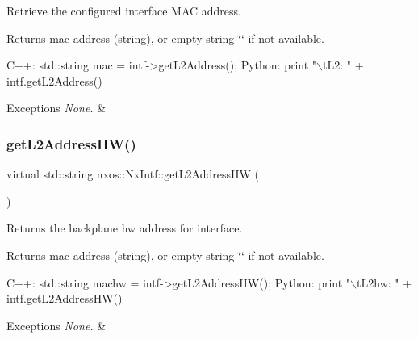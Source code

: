 Retrieve the configured interface M\+AC address.

\begin{DoxyReturn}{Returns}
mac address (string), or empty string \char`\"{}\char`\"{} if not available.
\end{DoxyReturn}

\begin{DoxyCode}
C++:
     std::string  mac = intf->getL2Address();
Python:
      print \textcolor{stringliteral}{"\(\backslash\)tL2: "} + intf.getL2Address()
\end{DoxyCode}



\begin{DoxyExceptions}{Exceptions}
{\em None.} & \\
\hline
\end{DoxyExceptions}
\mbox{\label{classnxos_1_1_nx_intf_a2c057f3f9691205712f70aea8c46f639}} 
\subsubsection{\texorpdfstring{get\+L2\+Address\+H\+W()}{getL2AddressHW()}}
{\footnotesize\ttfamily virtual std\+::string nxos\+::\+Nx\+Intf\+::get\+L2\+Address\+HW (\begin{DoxyParamCaption}{ }\end{DoxyParamCaption})\hspace{0.3cm}{\ttfamily [pure virtual]}}

Returns the backplane hw address for interface. ~\newline
 \begin{DoxyReturn}{Returns}
mac address (string), or empty string \char`\"{}\char`\"{} if not available.
\end{DoxyReturn}

\begin{DoxyCode}
C++:
      std::string  machw = intf->getL2AddressHW();
Python:
       print \textcolor{stringliteral}{"\(\backslash\)tL2hw: "} + intf.getL2AddressHW()
\end{DoxyCode}



\begin{DoxyExceptions}{Exceptions}
{\em None.} & \\
\hline
\end{DoxyExceptions}
\mbox{\label{classnxos_1_1_nx_intf_ace33155a23a777c0f6e5f978d44af0e6}} 
